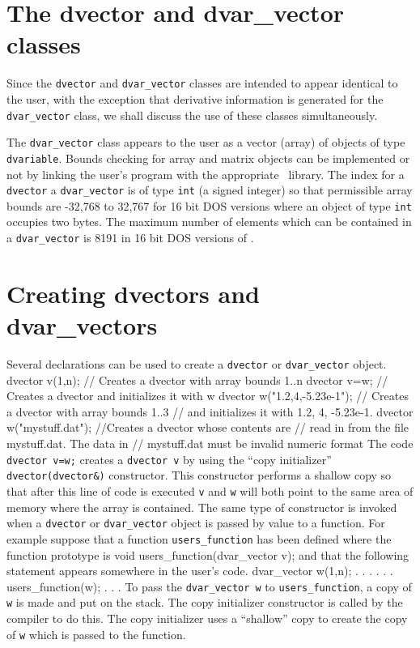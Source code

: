 \documentclass[12pt]{book}
\begin{document}
\section{The dvector and dvar\_vector classes}

Since the {\tt dvector} and {\tt dvar\_vector} classes are intended to
appear identical to the user, with the exception that derivative
information is generated for the {\tt dvar\_vector} class, we shall
discuss the use of these classes simultaneously.

 
The {\tt dvar\_vector} class appears to the user as a vector (array)
of objects of type {\tt dvariable}. 
Bounds checking for array and matrix objects
can be implemented or not by linking the user's program with
the appropriate \AD\ library. The index for a {\tt dvector}
a {\tt dvar\_vector}
is of type {\tt int} (a signed integer) so that permissible array bounds
are -32,768 to 32,767 for 16 bit DOS versions where an object of type {\tt int} 
occupies two bytes.  The maximum number of elements which can be contained
in a {\tt dvar\_vector} is 8191 in 16 bit DOS versions of \AD.

\section{Creating dvectors and dvar\_vectors}
Several declarations can be used to create
a {\tt dvector} or {\tt dvar\_vector} object.
\beginexamplea
dvector v(1,n); // Creates a dvector with array bounds 1..n
dvector v=w;    // Creates a dvector and initializes it with w
dvector w("{1.2,4,-5.23e-1}");  // Creates a dvector with array bounds 1..3
                     // and initializes it with 1.2, 4, -5.23e-1.
dvector w("mystuff.dat"); //Creates a dvector whose contents are
                     // read in from the file mystuff.dat. The data in
                     // mystuff.dat must be invalid numeric format 
\endexample
The code {\tt dvector v=w;} creates a {\tt dvector v} 
by using  the ``copy initializer'' 
 {\tt dvector(dvector\&)} 
constructor. This constructor performs a shallow copy so that
after this line of code is executed {\tt v} and {\tt w} will
both point to the same area of memory where the array is contained.
The same type of constructor is 
invoked when a {\tt dvector} or 
{\tt dvar\_vector} object is passed by value
to a function. For example suppose that a function {\tt users\_function}
has been defined where the function prototype is
\beginexamplea
void users_function(dvar\_vector v);
\endexample
\noindent and that the following statement appears somewhere in the user's code.
\beginexamplea
dvar\_vector w(1,n);
. . .
. . .
users_function(w);
. . .
\endexample
To pass the {\tt dvar\_vector w} to {\tt users\_function}, a copy of
{\tt w} is made and put on the stack. The copy initializer constructor
is called by the compiler to do this. 
The copy initializer uses a ``shallow'' copy to
create the copy of {\tt w} which is passed to the function.
\end{document}
